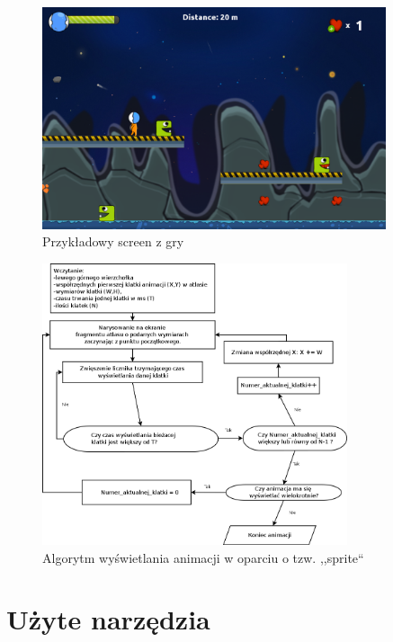 \begin{figure}[h]
    \centering
    \includegraphics[width=0.9\textwidth,natwidth=525,natheight=142]{./Pictures/gra1.png}
    \caption{Przykładowy screen z gry}
\end{figure}


\begin{figure}[h]
    \centering
    \includegraphics[width=0.8\textwidth,natwidth=510,natheight=142]{./Pictures/sprite_algorytm.png}
    \caption{Algorytm wyświetlania animacji w oparciu o tzw. ,,sprite``}
\end{figure}

\section{Użyte narzędzia}
